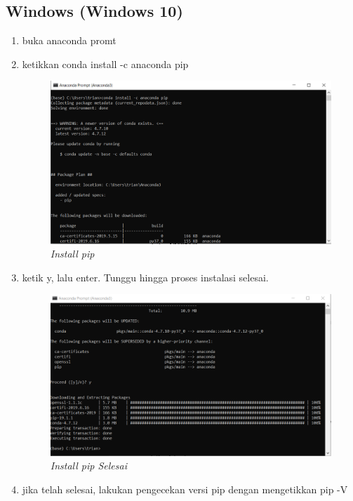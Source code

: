 \subsection{Windows (Windows 10)}
\begin{enumerate}
\item buka anaconda promt
\item ketikkan conda install -c anaconda pip
\begin{figure}[H]
    \centering
    \includegraphics[scale=0.5]{figures/installpip (2)}
    \caption{\textit{Install pip}}
    \label{Figureanaconda70}
\end{figure}
\item ketik y, lalu enter. Tunggu hingga proses instalasi selesai.
\begin{figure}[H]
    \centering
    \includegraphics[scale=0.5]{figures/pipselesai}
    \caption{\textit{Install pip Selesai}}
    \label{Figureanaconda70}
\end{figure}
\item jika telah selesai, lakukan pengecekan versi pip dengan mengetikkan pip -V

\end{enumerate}
